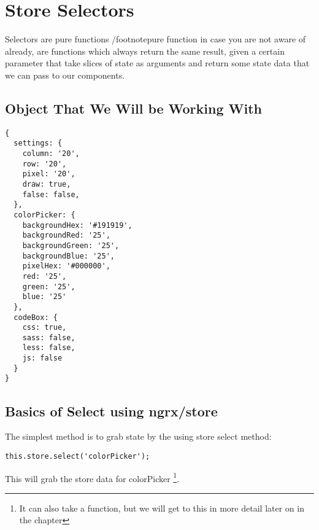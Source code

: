 \maketitle{}
\section{ Store Selectors }

Selectors are pure functions /footnote{pure function in case you are not aware
of already, are functions which always return the same result, given a certain
parameter} that take slices of state as arguments and return some state data
that we can pass to our components.


\subsection{Object That We Will be Working With}
\begin{verbatim}
{
  settings: {
    column: '20',
    row: '20',
    pixel: '20',
    draw: true,
    false: false,
  },
  colorPicker: {
    backgroundHex: '#191919',
    backgroundRed: '25',
    backgroundGreen: '25',
    backgroundBlue: '25',
    pixelHex: '#000000',
    red: '25',
    green: '25',
    blue: '25'
  },
  codeBox: {
    css: true,
    sass: false,
    less: false,
    js: false
  }
}
\end{verbatim}

\subsection{Basics of Select using ngrx/store}

The simplest method is to grab state by the using store select method:
\begin{lstlisting}
this.store.select('colorPicker');
\end{lstlisting}

This will grab the store data for colorPicker \footnote{It can also take a
function, but we will get to this in more detail later on in the chapter}.
